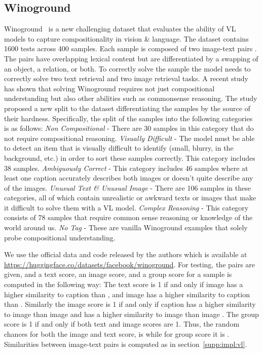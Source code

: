 \documentclass[11pt]{article}
\def\secref#1{section~\ref{#1}}
\newcommand{\minisection}[1]{\noindent{\textbf{#1}.}}
\begin{document}
\subsection{Winoground}
\label{supp:impl:wino}

\minisection{Dataset} Winoground~\cite{winoground} is a new challenging dataset that evaluates the ability of VL models to capture compositionality in vision \& language. The dataset contains 1600 tests across 400 samples. Each sample is composed of two image-text pairs . The pairs have overlapping lexical content but are differentiated by a swapping of an object, a relation, or both. To correctly solve the sample the model needs to correctly solve two text retrieval and two image retrieval tasks. A recent study~\cite{Diwan2022WhyIW} has shown that solving  Winoground requires not just compositional understanding but also other abilities such as commonsense reasoning. The study proposed a new split to the dataset differentiating the samples by the source of their hardness. Specifically, the split of the samples into the following categories is as follows: \emph{Non Compositional} - There are 30 samples in this category that do not require compositional reasoning. \emph{Visually Difficult} - The model must be able to detect an item that is visually difficult to identify (small, blurry, in the background, etc.) in order to sort these samples correctly. This category includes 38 samples. \emph{Ambiguously Correct} - This category includes 46 samples where at least one caption accurately describes both images or doesn't quite describe any of the images. \emph{Unusual Text \& Unusual Image} - There are 106 samples in these categories, all of which contain unrealistic or awkward texts or images that make it difficult to solve them with a VL model. \emph{Complex Reasoning} - This category consists of 78 samples that require common sense reasoning or knowledge of the world around us. \emph{No Tag} - These are vanilla Winoground examples that solely probe compositional understanding.   



\minisection{Inference details} We use the official data and code released by the authors which is available at \url{https://huggingface.co/datasets/facebook/winoground}. For testing, the pairs are given, and a text score, an image score, and a group score for a sample is computed in the following way: The text score is 1 if and only if image  has a higher similarity to caption  than , and image  has a higher similarity to caption  than . Similarly the image score is 1 if and only if caption  has a higher similarity to image  than image  and  has a higher similarity to image  than image . The group score is 1 if and only if both text and image scores are 1. Thus, the random chances for both the image and text score, is  while for group score it is . Similarities between image-text pairs is computed as in \secref{supp:impl:vl}.
\end{document}
